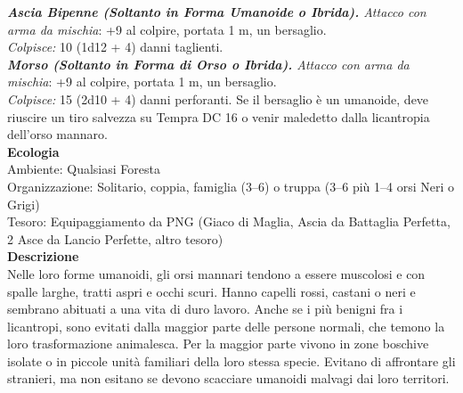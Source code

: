 \begin{multicols}{2}
\emph{\textbf{Ascia Bipenne (Soltanto in Forma Umanoide o Ibrida).} Attacco con arma da mischia}: +9 al colpire, portata 1 m, un bersaglio.\\
\emph{Colpisce:} 10 (1d12 + 4) danni taglienti.\\

\emph{\textbf{Morso (Soltanto in Forma di Orso o Ibrida).} Attacco con arma da mischia}: +9 al colpire, portata 1 m, un bersaglio.\\

\emph{Colpisce:} 15 (2d10 + 4) danni perforanti. Se il bersaglio è un umanoide, deve riuscire un tiro salvezza su Tempra DC  16 o venir maledetto dalla licantropia dell'orso mannaro.\\
\textbf{Ecologia}\\
Ambiente: Qualsiasi Foresta\\
Organizzazione: Solitario, coppia, famiglia (3–6) o truppa (3–6 più 1–4 orsi Neri o Grigi)\\
Tesoro: Equipaggiamento da PNG (Giaco di Maglia, Ascia da Battaglia Perfetta, 2 Asce da Lancio Perfette, altro tesoro)\\
\textbf{Descrizione}\\
Nelle loro forme umanoidi, gli orsi mannari tendono a essere muscolosi e con spalle larghe, tratti aspri e occhi scuri. Hanno capelli rossi, castani o neri e sembrano abituati a una vita di duro lavoro. Anche se i più benigni fra i licantropi, sono evitati dalla maggior parte delle persone normali, che temono la loro trasformazione animalesca. Per la maggior parte vivono in zone boschive isolate o in piccole unità familiari della loro stessa specie. Evitano di affrontare gli stranieri, ma non esitano se devono scacciare umanoidi malvagi dai loro territori.\\


\end{multicols}
